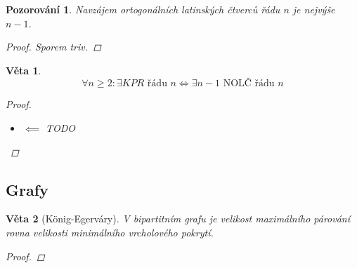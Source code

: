 \documentclass[10pt,a4paper]{article}
\theoremstyle{plain}
\newtheorem*{veta}{Věta}
\newtheorem*{pozorovani}{Pozorování}
\begin{document}
\begin{pozorovani}
Navzájem ortogonálních latinských čtverců řádu $n$ je nejvýše $n-1$.
\begin{proof}
Sporem triv.
\end{proof}
\end{pozorovani}

\begin{veta}
\[\forall n \geq 2: \exists KPR \text{ řádu } n \iff \exists n - 1 \text{ NOLČ řádu }n\]
\begin{proof}
\begin{itemize} $\implies$

Uvažme přímku $P = \{ y_0, ..., y_n \}$, $\forall y_i$ prochází bodem přímky $P_{i_i}, P_{i_n}$

Buď $\{X_{i,j} = P_{0_i} \cap P_{n_j}\}$.

Pro $k=1,...,n-1$ definujeme
\[ {L_k}_{i,j} = l \iff X_{i,j} \in P_{k,l}\]

Tyto čtverce jsou NOLČ. \begin{itemize}
\item Každé pole má přiřazené číslo: Podle (A1) $y_k, x_{i,j}$ musí procházet nějaká přímka.
\item V řádcích nejsou opakování. Sporem \[\exists i,j \neq j^\prime,l (L_k)_{i,j}= (L_k)_{i,j^\prime} = l\]
\[ \implies x_{i,j}= x_{i,j^\prime} \in P_{k,l} \implies |P_{k,l} \cap P_{0,i} | > 1\]
Spor s A2
\item Analogicky pro sloupce. 
\item Ortogonalita: Pro $k\neq k^\prime, l \neq l^\prime$ chceme $i,j$...

Přímky $P_{k,l}, P_{k^\prime,l^\prime}$. Tyto přímky mají nutně průnik, $exists x_{i,j}$.
\end{itemize}
\item $\impliedby$
TODO
\end{itemize}
\end{proof}
\end{veta}

\subsection{Grafy}

\begin{veta}[König-Egerváry]
V bipartitním grafu je velikost maximálního párování rovna velikosti minimálního vrcholového pokrytí.
\begin{proof}
\end{proof}
\end{veta}
\end{document}
